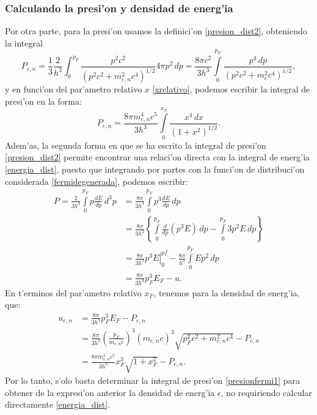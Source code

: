 \subsubsection{Calculando la presi'on y densidad de energ'ia}
Por otra parte, para la presi'on usamos la definici'on \eqref{presion_dist2}, obteniendo la integral
\begin{equation}
 P_{e,n}=\frac{1}{3}\frac{2}{h^3}\int_0^{p_F}\frac{p^2c^2}{(p^2 c^2+m_{e,n}^2 c^4)^{1/2}}4\pi p^2\,dp=\frac{8\pi c^2}{3h^3}\int\limits_0^{p_F}\frac{p^4\,dp}{(p^2 c^2+m_e^2c^4)^{1/2}},
\end{equation}
y en funci'on del par'ametro relativo $x$ \eqref{xrelativo}, podemos escribir la integral de presi'on en la forma:
\begin{equation}\label{presionfermi1}
P_{e,n}=\frac{8\pi m_{e,n}^4c^5}{3h^3}\int\limits_0^{x_F}\frac{x^4\,dx}{(1+x^2)^{1/2}}.
\end{equation}
Adem'as, la segunda forma en que se ha escrito la integral de presi'on \eqref{presion_dist2}  permite encontrar una relaci'on directa con la integral de energ'ia \eqref{energia_dist}, puesto que integrando por partes con la funci'on de distribuci'on considerada \eqref{fermidegenerada}, podemos escribir:
\begin{align}
 P=\frac{2}{3h^3}\int\limits_0^{p_F} p\frac{dE}{dp}\,d^3p&=\frac{8\pi}{3h^3}\int\limits_0^{p_F} p^3\frac{dE}{dp}\,dp\\
&=\frac{8\pi}{3h^3}\left\{\int\limits_0^{p_F} \frac{d}{dp}\left(p^3 E\right)\,dp-\int\limits_0^{p_F} 3p^2E\,dp\right\}\\
&=\left.\frac{8\pi}{3h^3}p^3E\right|_0^{pf}-\frac{8\pi}{h^3}\int\limits_0^{p_F}Ep^2\,dp\\
&=\frac{8\pi}{3h^3}p_F^3E_F-u\label{integral-presion-energia-fermi}.
\end{align}
En t'erminos del par'ametro relativo $x_F$, tenemos para la densidad de energ'ia, que:
\begin{align}
u_{e,n}&=\frac{8\pi}{3h^3}p_F^3E_F-P_{e,n}\\
&=\frac{8\pi}{3h^3}\left(\frac{p_F}{m_{e,n}c}\right)^3\left(m_{e,n}c\right)^3\sqrt{p_F^2c^2+m_{e,n}^2c^4}-P_{e,n}\\
&=\frac{8\pi m_{e,n}^4c^5}{3h^3}x_F^3\sqrt{1+x_F^2}-P_{e,n}.\label{fermi-relacion-presion-energia}
\end{align}
Por lo tanto, s'olo basta determinar la integral de presi'on \eqref{presionfermi1} para obtener de la expresi'on anterior la densidad de energ'ia $\epsilon$, no requiriendo calcular directamente \eqref{energia_dist}.
